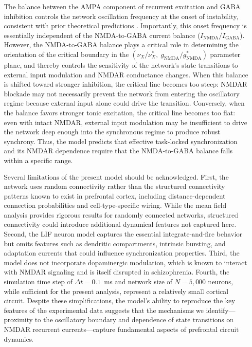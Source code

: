 \documentclass[10pt]{article}
\begin{document}
The balance between the AMPA component of recurrent excitation and GABA inhibition controls the network oscillation frequency at the onset of instability, consistent with prior theoretical predictions \citep{brunel2003fast}. Importantly, this onset frequency is essentially independent of the NMDA-to-GABA current balance ($I_{\mathrm{NMDA}}/I_{\mathrm{GABA}}$). However, the NMDA-to-GABA balance plays a critical role in determining the orientation of the critical boundary in the $(\nu_X/\nu_X^*, \; g_{\mathrm{NMDA}}/g_{\mathrm{NMDA}}^*)$ parameter plane, and thereby controls the sensitivity of the network's state transitions to external input modulation and NMDAR conductance changes. When this balance is shifted toward stronger inhibition, the critical line becomes too steep: NMDAR blockade may not necessarily prevent the network from entering the oscillatory regime because external input alone could drive the transition. Conversely, when the balance favors stronger tonic excitation, the critical line becomes too flat: even with intact NMDAR, external input modulation may be insufficient to drive the network deep enough into the synchronous regime to produce robust synchrony. Thus, the model predicts that effective task-locked synchronization and its NMDAR dependence require that the NMDA-to-GABA balance falls within a specific range.

Several limitations of the present model should be acknowledged. First, the network uses random connectivity rather than the structured connectivity patterns known to exist in prefrontal cortex, including distance-dependent connection probabilities and cell-type-specific wiring. While the mean field analysis provides rigorous results for randomly connected networks, structured connectivity could introduce additional dynamical features not captured here. Second, the LIF neuron model captures the essential integrate-and-fire behavior but omits features such as dendritic compartments, intrinsic bursting, and adaptation currents that could influence synchronization properties. Third, the model does not incorporate dopaminergic modulation, which is known to interact with NMDAR signaling and is itself disrupted in schizophrenia. Fourth, the simulation time step of $\Delta t = 0.1$~ms and network size of $N = 5{,}000$ neurons, while sufficient for the present analysis, represent a relatively small cortical circuit. Despite these simplifications, the model's ability to reproduce the key features of the experimental data suggests that the mechanisms we identify---proximity to the oscillatory boundary and dependence of state transitions on NMDAR recurrent currents---capture fundamental aspects of prefrontal circuit dynamics.
\end{document}
